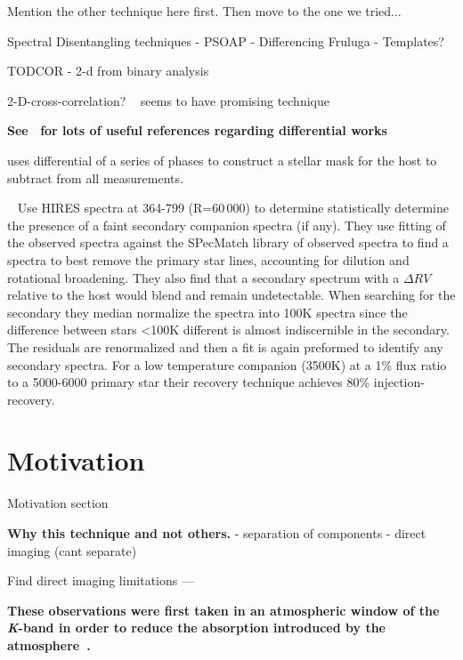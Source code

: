 Mention the other technique here first.
Then move to the one we tried...




Spectral Disentangling techniques
- PSOAP
- Differencing Fruluga
- Templates?

TODCOR - 2-d from binary analysis~\citep{zucker_study_1994}
\citep{mazeh_detecting_1997}

2-D-cross-correlation?  ~\citet{piskorz_evidence_2016} seems to have promising technique


\textbf{
See~\citet{kostogryz_spectral_2013} for lots of useful references regarding differential works~\citet{simon_disentangling_1994}}

\citet{rodler_weighing_2012} uses differential of a series of phases to construct a stellar mask for the host to subtract from all measurements.



{\red{}~\citet{kolbl_detection_2015} Use HIRES spectra at 364-799\nm{} (R=60\,000) to determine statistically determine the presence of a faint secondary companion spectra (if any).
They use \textchisquared fitting of the observed spectra against the {SPecMatch} library of observed spectra to find a spectra to best remove the primary star lines,
accounting for dilution and rotational broadening.
They also find that a secondary spectrum with a $\Delta RV$ relative to the host would blend and remain undetectable.
When searching for the secondary they median normalize the spectra into 100K spectra since the difference between stars  <100K different is almost indiscernible in the secondary. The residuals are renormalized and then a \textchisquared fit is again preformed to identify any secondary spectra.
For a low temperature companion (3500K) at a 1\% flux ratio to a 5000-6000\K{} primary star their recovery technique achieves 80\% injection-recovery.}



\section{Motivation}

Motivation section

\textbf{Why this technique and not others.}
- separation of components
- direct imaging (cant separate)


Find direct imaging limitations ---



\textbf{These observations were first taken in an atmospheric window of the \emph{K}-band in order to reduce the absorption introduced by the atmosphere~\citep{barnes_hd_2008}.
}
